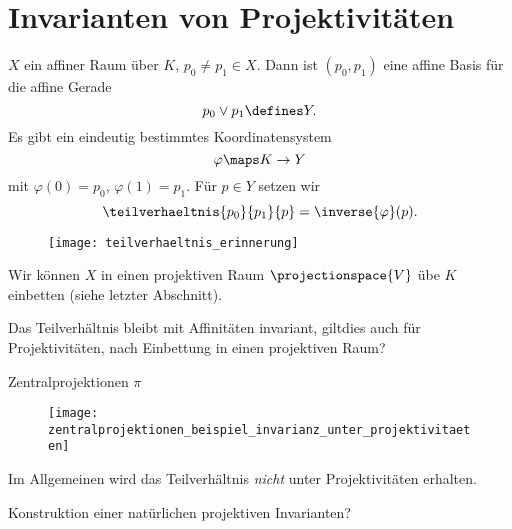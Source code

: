 \section{Invarianten von Projektivitäten}
\begin{erinnerung*}
  \( X \) ein affiner Raum über \( K \), \( p_0\neq p_1\in X \). Dann ist \( (p_0,p_1) \) eine affine Basis für die affine Gerade
  \begin{equation*}
    p_0\vee p_1\defines Y.
  \end{equation*}
  Es gibt ein eindeutig bestimmtes Koordinatensystem
  \begin{equation*}
    \varphi\maps K\to Y
  \end{equation*}
  mit \( \varphi(0)=p_0 \), \( \varphi(1)=p_1 \). Für \( p\in Y \) setzen wir
  \begin{equation*}
    \teilverhaeltnis{p_0}{p_1}{p}=\inverse{\varphi}(p).
  \end{equation*}
  \begin{beispiel*}
    \begin{figure}[H]
      \centering
      \texttt{[image: teilverhaeltnis\_erinnerung]}
      \label{fig:teilverhaeltnis_erinnerung}
    \end{figure}
  \end{beispiel*}
  Wir können \( X \) in einen projektiven Raum \( \projectionspace{V} \) übe \( K \) einbetten (siehe letzter Abschnitt).
\end{erinnerung*}
\begin{frage*}
  Das Teilverhältnis bleibt mit Affinitäten invariant, giltdies auch für Projektivitäten, nach Einbettung in einen projektiven Raum?
\end{frage*}
\begin{beispiel*}
  Zentralprojektionen \( \pi \)
  \begin{figure}[H]
    \centering
    \texttt{[image: zentralprojektionen\_beispiel\_invarianz\_unter\_projektivitaeten]}
    \label{fig:zentralprojektionen_beispiel_invarianz_unter_projektivitaeten}
  \end{figure}
  Im Allgemeinen wird das Teilverhältnis \emph{nicht} unter Projektivitäten erhalten.
\end{beispiel*}
\begin{frage*}
  Konstruktion einer natürlichen projektiven Invarianten?
\end{frage*}
